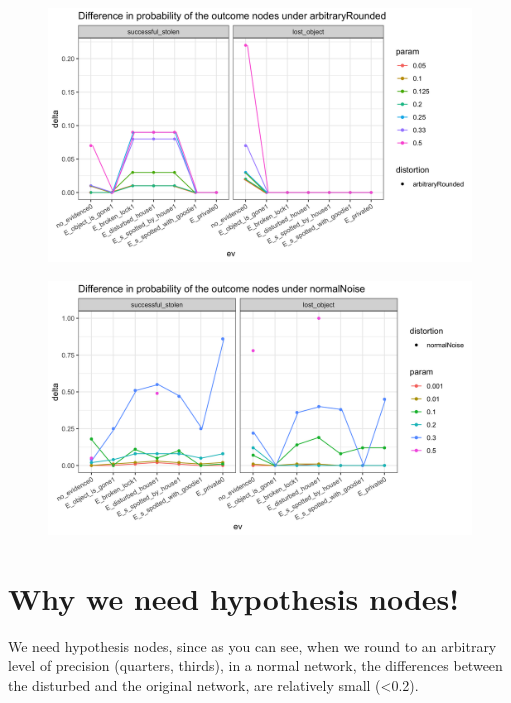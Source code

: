 \documentclass[11pt]{amsart}
\begin{document}
\begin{figure}[htbp]
\begin{center}
\includegraphics[scale=0.17]{images/arbitraryRoundeddelta.png}
\label{default}
\end{center}
\end{figure}

\begin{figure}[htbp]
\begin{center}
\includegraphics[scale=0.17]{images/normalNoisedelta.png}
\label{default}
\end{center}
\end{figure}


\clearpage

\section{Why we need hypothesis nodes!}
We need hypothesis nodes, since as you can see, when we round to an arbitrary level of precision (quarters, thirds), in a normal network, the differences between the disturbed and the original network, are relatively small (<0.2). 
\end{document}
